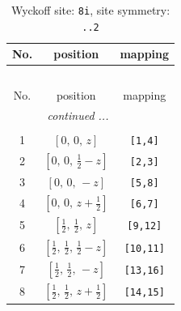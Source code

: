 \documentclass[fleqn,8pt]{jsarticle}
\begin{document}
\begin{longtable}{ccc}
\caption{Wyckoff site: {\tt 8i}, site symmetry: {\tt ..2}}
 \\
 \hline \hline
No. & position & mapping \\ \hline \endfirsthead

\multicolumn{2}{l}{\tablename\ \thetable{}} \\
 \hline \hline
No. & position & mapping \\ \hline \endhead

 \hline \hline
\multicolumn{2}{r}{\footnotesize\it continued ...} \\ \endfoot

 \hline \hline
\multicolumn{2}{r}{} \\ \endlastfoot

1 & $\left[ 0,\, 0,\, z \right]$ & {\tt [1,4]} \\ \hline
2 & $\left[ 0,\, 0,\, \frac{1}{2} - z \right]$ & {\tt [2,3]} \\ \hline
3 & $\left[ 0,\, 0,\, - z \right]$ & {\tt [5,8]} \\ \hline
4 & $\left[ 0,\, 0,\, z + \frac{1}{2} \right]$ & {\tt [6,7]} \\ \hline
5 & $\left[ \frac{1}{2},\, \frac{1}{2},\, z \right]$ & {\tt [9,12]} \\ \hline
6 & $\left[ \frac{1}{2},\, \frac{1}{2},\, \frac{1}{2} - z \right]$ & {\tt [10,11]} \\ \hline
7 & $\left[ \frac{1}{2},\, \frac{1}{2},\, - z \right]$ & {\tt [13,16]} \\ \hline
8 & $\left[ \frac{1}{2},\, \frac{1}{2},\, z + \frac{1}{2} \right]$ & {\tt [14,15]} \\
\end{longtable}
\renewcommand{\arraystretch}{1.2}
\end{document}
